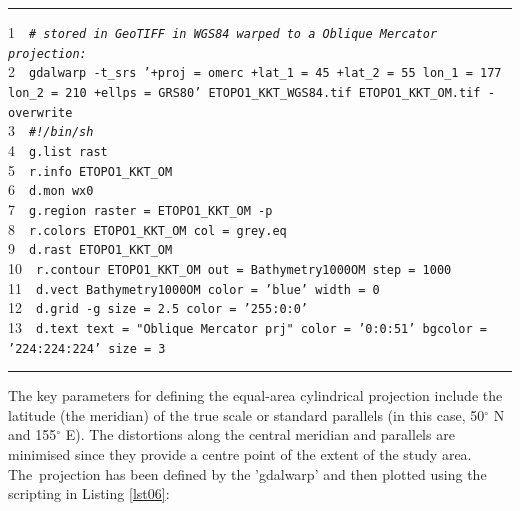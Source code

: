 \documentclass[technologies,article,accept,pdftex,moreauthors]{Definitions/mdpi}
\begin{document}
\begin{listing}[H]
\caption{GRASS GIS %
 script for plotting map in oblique Mercator projection.}\label{lst05}
\rule{\columnwidth}{1pt}
\raggedright
1~~\texttt{\emph{\# stored in GeoTIFF in WGS84 warped to a Oblique Mercator projection:\\}}
2~~\texttt{gdalwarp -t\_srs '+proj = omerc +lat\_1 = 45 +lat\_2 = 55 lon\_1 = 177 lon\_2 = 210 +ellps = GRS80' ETOPO1\_KKT\_WGS84.tif ETOPO1\_KKT\_OM.tif -overwrite\\}
3~~\texttt{\emph{\#!/bin/sh\\}}
4~~\texttt{g.list rast\\}
5~~\texttt{r.info ETOPO1\_KKT\_OM\\}
6~~\texttt{d.mon wx0\\}
7~~\texttt{g.region raster = ETOPO1\_KKT\_OM -p\\}
8~~\texttt{r.colors ETOPO1\_KKT\_OM col = grey.eq\\}
9~~\texttt{d.rast ETOPO1\_KKT\_OM\\}
10~~\texttt{r.contour ETOPO1\_KKT\_OM out = Bathymetry1000OM step = 1000\\}
11~~\texttt{d.vect Bathymetry1000OM color = 'blue' width = 0\\}
12~~\texttt{d.grid -g size = 2.5 color = '255:0:0'\\}
13~~\texttt{d.text text = "Oblique Mercator prj" color = '0:0:51' bgcolor = '224:224:224' size = 3\\}
\rule{\columnwidth}{1pt}
\end{listing}

{The key parameters for defining the equal-area cylindrical projection include the latitude (the meridian) of the true scale or standard parallels (in this case, }50$^{\circ}$ N and 155$^{\circ}$ E). {The distortions along the central meridian and parallels are minimised since they provide a centre point of the extent of the study area. The~projection has been defined by the 'gdalwarp' and then plotted using the scripting in Listing} \ref{lst06}:
\end{document}
